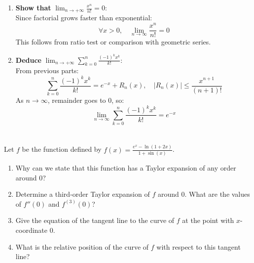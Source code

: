 \documentclass[12pt]{article}
\begin{document}
\begin{answerbox}
\begin{enumerate}
    \item \textbf{Show that } $ \lim_{n \to +\infty} \frac{x^n}{n!} = 0 $: \\
    Since factorial grows faster than exponential:
    $$
    \forall x > 0, \quad \lim_{n \to \infty} \frac{x^n}{n!} = 0
    $$
    This follows from ratio test or comparison with geometric series.

    \item \textbf{Deduce } $ \lim_{n \to +\infty} \sum_{k=0}^n \frac{(-1)^k x^k}{k!} $: \\
    From previous parts:
    $$
    \sum_{k=0}^n \frac{(-1)^k x^k}{k!} = e^{-x} + R_n(x), \quad |R_n(x)| \leq \frac{x^{n+1}}{(n+1)!}
    $$
    As $ n \to \infty $, remainder goes to 0, so:
    $$
    \lim_{n \to \infty} \sum_{k=0}^n \frac{(-1)^k x^k}{k!} = e^{-x}
    $$
\end{enumerate}
\end{answerbox}

\newpage

\section{}
Let $f$ be the function defined by $f(x) = \frac{e^x - \ln(1+2x)}{1+\sin(x)}$.
\begin{enumerate}
    \item Why can we state that this function has a Taylor expansion of any order around $0$?
    
    \item Determine a third-order Taylor expansion of $f$ around $0$. What are the values of $f''(0)$ and $f^{(3)}(0)$?
    
    \item Give the equation of the tangent line to the curve of $f$ at the point with $x$-coordinate $0$.
    
    \item What is the relative position of the curve of $f$ with respect to this tangent line?
\end{enumerate}

\newpage
\end{document}
